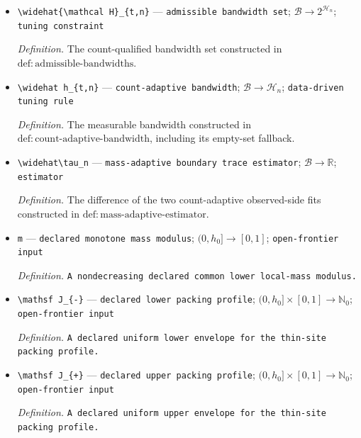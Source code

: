 \documentclass{article}
\begin{document}
\begin{itemize}
  \item \texttt{\textbackslash{}\allowbreak{}widehat\{\textbackslash{}\allowbreak{}mathcal H\}\allowbreak{}\_\allowbreak{}\{t,\allowbreak{}n\}\allowbreak{}} --- \texttt{admissible bandwidth set}; \(\mathcal B\to2^{\mathcal H_n}\); \texttt{tuning constraint}
  \par\smallskip\noindent\emph{Definition.} The count-qualified bandwidth set constructed in \(\mathrm{def:admissible\text{-}bandwidths}\).
  \item \texttt{\textbackslash{}\allowbreak{}widehat h\_\allowbreak{}\{t,\allowbreak{}n\}\allowbreak{}} --- \texttt{count-\allowbreak{}adaptive bandwidth}; \(\mathcal B\to\mathcal H_n\); \texttt{data-\allowbreak{}driven tuning rule}
  \par\smallskip\noindent\emph{Definition.} The measurable bandwidth constructed in \(\mathrm{def:count\text{-}adaptive\text{-}bandwidth}\), including its empty-set fallback.
  \item \texttt{\textbackslash{}\allowbreak{}widehat\textbackslash{}\allowbreak{}tau\_\allowbreak{}n} --- \texttt{mass-\allowbreak{}adaptive boundary trace estimator}; \(\mathcal B\to\mathbb R\); \texttt{estimator}
  \par\smallskip\noindent\emph{Definition.} The difference of the two count-adaptive observed-side fits constructed in \(\mathrm{def:mass\text{-}adaptive\text{-}estimator}\).
  \item \texttt{m} --- \texttt{declared monotone mass modulus}; \((0,h_0]\to[0,1]\); \texttt{open-\allowbreak{}frontier input}
  \par\smallskip\noindent\emph{Definition.} \texttt{A nondecreasing declared common lower local-\allowbreak{}mass modulus.}
  \item \texttt{\textbackslash{}\allowbreak{}mathsf J\_\allowbreak{}\{-\allowbreak{}\}\allowbreak{}} --- \texttt{declared lower packing profile}; \((0,h_0]\times[0,1]\to\mathbb N_0\); \texttt{open-\allowbreak{}frontier input}
  \par\smallskip\noindent\emph{Definition.} \texttt{A declared uniform lower envelope for the thin-\allowbreak{}site packing profile.}
  \item \texttt{\textbackslash{}\allowbreak{}mathsf J\_\allowbreak{}\{+\allowbreak{}\}\allowbreak{}} --- \texttt{declared upper packing profile}; \((0,h_0]\times[0,1]\to\mathbb N_0\); \texttt{open-\allowbreak{}frontier input}
  \par\smallskip\noindent\emph{Definition.} \texttt{A declared uniform upper envelope for the thin-\allowbreak{}site packing profile.}

\end{itemize}
\end{document}
